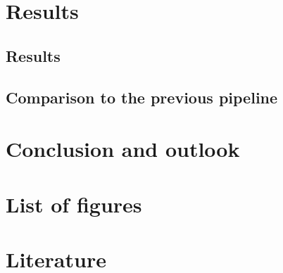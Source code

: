 \documentclass[12pt, oneside]{article}
\begin{document}
\section{Results}
\subsection{Results}
\subsection{Comparison to the previous pipeline}
\newpage
\section{Conclusion and outlook}
\newpage
\section{List of figures}
\newpage
\section{Literature}
\printbibliography
\end{document}
